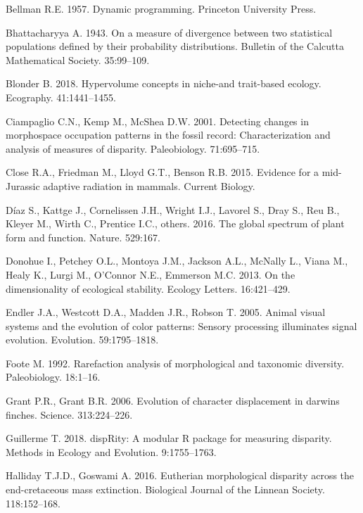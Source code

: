 \documentclass[]{article}
\begin{document}
\hypertarget{ref-cursedimensionality}{}
Bellman R.E. 1957. Dynamic programming. Princeton University Press.

\hypertarget{ref-bhattacharyya1943}{}
Bhattacharyya A. 1943. On a measure of divergence between two
statistical populations defined by their probability distributions.
Bulletin of the Calcutta Mathematical Society. 35:99--109.

\hypertarget{ref-blonder2018}{}
Blonder B. 2018. Hypervolume concepts in niche-and trait-based ecology.
Ecography. 41:1441--1455.

\hypertarget{ref-ciampaglio2001}{}
Ciampaglio C.N., Kemp M., McShea D.W. 2001. Detecting changes in
morphospace occupation patterns in the fossil record: Characterization
and analysis of measures of disparity. Paleobiology. 71:695--715.

\hypertarget{ref-close2015}{}
Close R.A., Friedman M., Lloyd G.T., Benson R.B. 2015. Evidence for a
mid-Jurassic adaptive radiation in mammals. Current Biology.

\hypertarget{ref-diaz2016}{}
Díaz S., Kattge J., Cornelissen J.H., Wright I.J., Lavorel S., Dray S.,
Reu B., Kleyer M., Wirth C., Prentice I.C., others. 2016. The global
spectrum of plant form and function. Nature. 529:167.

\hypertarget{ref-donohue2013}{}
Donohue I., Petchey O.L., Montoya J.M., Jackson A.L., McNally L., Viana
M., Healy K., Lurgi M., O'Connor N.E., Emmerson M.C. 2013. On the
dimensionality of ecological stability. Ecology Letters. 16:421--429.

\hypertarget{ref-endler2005}{}
Endler J.A., Westcott D.A., Madden J.R., Robson T. 2005. Animal visual
systems and the evolution of color patterns: Sensory processing
illuminates signal evolution. Evolution. 59:1795--1818.

\hypertarget{ref-foote1992}{}
Foote M. 1992. Rarefaction analysis of morphological and taxonomic
diversity. Paleobiology. 18:1--16.

\hypertarget{ref-grant2006}{}
Grant P.R., Grant B.R. 2006. Evolution of character displacement in
darwins finches. Science. 313:224--226.

\hypertarget{ref-disprity}{}
Guillerme T. 2018. dispRity: A modular R package for measuring
disparity. Methods in Ecology and Evolution. 9:1755--1763.

\hypertarget{ref-halliday2015}{}
Halliday T.J.D., Goswami A. 2016. Eutherian morphological disparity
across the end-cretaceous mass extinction. Biological Journal of the
Linnean Society. 118:152--168.
\end{document}

